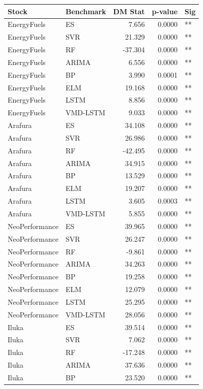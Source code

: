 \begin{tabular}{llrrl} \toprule
Stock & Benchmark & DM Stat & p-value & Sig \\ \midrule
EnergyFuels & ES & 7.656 & 0.0000 & ** \\ 
EnergyFuels & SVR & 21.329 & 0.0000 & ** \\ 
EnergyFuels & RF & -37.304 & 0.0000 & ** \\ 
EnergyFuels & ARIMA & 6.556 & 0.0000 & ** \\ 
EnergyFuels & BP & 3.990 & 0.0001 & ** \\ 
EnergyFuels & ELM & 19.168 & 0.0000 & ** \\ 
EnergyFuels & LSTM & 8.856 & 0.0000 & ** \\ 
EnergyFuels & VMD-LSTM & 9.033 & 0.0000 & ** \\ 
Arafura & ES & 34.108 & 0.0000 & ** \\ 
Arafura & SVR & 26.986 & 0.0000 & ** \\ 
Arafura & RF & -42.495 & 0.0000 & ** \\ 
Arafura & ARIMA & 34.915 & 0.0000 & ** \\ 
Arafura & BP & 13.529 & 0.0000 & ** \\ 
Arafura & ELM & 19.207 & 0.0000 & ** \\ 
Arafura & LSTM & 3.605 & 0.0003 & ** \\ 
Arafura & VMD-LSTM & 5.855 & 0.0000 & ** \\ 
NeoPerformance & ES & 39.965 & 0.0000 & ** \\ 
NeoPerformance & SVR & 26.247 & 0.0000 & ** \\ 
NeoPerformance & RF & -9.861 & 0.0000 & ** \\ 
NeoPerformance & ARIMA & 34.263 & 0.0000 & ** \\ 
NeoPerformance & BP & 19.258 & 0.0000 & ** \\ 
NeoPerformance & ELM & 12.079 & 0.0000 & ** \\ 
NeoPerformance & LSTM & 25.295 & 0.0000 & ** \\ 
NeoPerformance & VMD-LSTM & 28.056 & 0.0000 & ** \\ 
Iluka & ES & 39.514 & 0.0000 & ** \\ 
Iluka & SVR & 7.062 & 0.0000 & ** \\ 
Iluka & RF & -17.248 & 0.0000 & ** \\ 
Iluka & ARIMA & 37.636 & 0.0000 & ** \\ 
Iluka & BP & 23.520 & 0.0000 & ** \\ 

\end{tabular}
